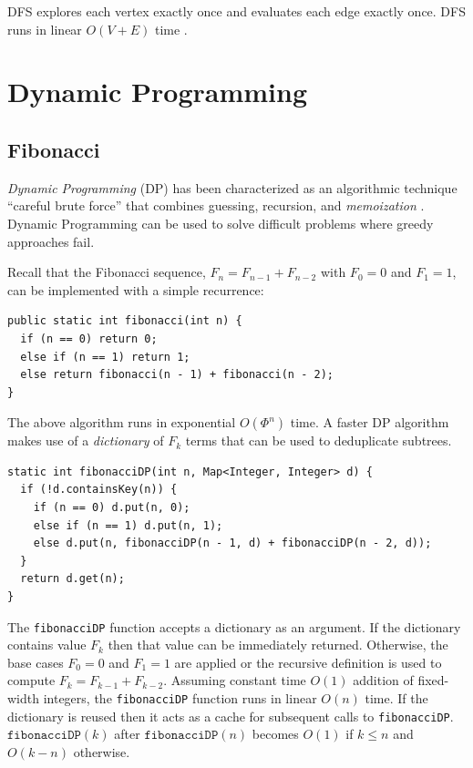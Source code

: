 \documentclass{book}
\begin{document}
DFS explores each vertex exactly once and evaluates each edge exactly once. DFS runs in linear $O(V+E)$ time \cite{cormen2001introduction}.

\chapter{Dynamic Programming}

\section{Fibonacci}

\textit{Dynamic Programming} (DP) has been characterized as an algorithmic technique ``careful brute force'' that combines guessing, recursion, and \textit{memoization} \cite{demaine_dp2}. Dynamic Programming can be used to solve difficult problems where greedy approaches fail.

Recall that the Fibonacci sequence, $F_n=F_{n-1} + F_{n-2}$ with $F_0=0$ and $F_1=1$, can be implemented with a simple recurrence:

\begin{lstlisting}
public static int fibonacci(int n) {
  if (n == 0) return 0;
  else if (n == 1) return 1;
  else return fibonacci(n - 1) + fibonacci(n - 2);
}
\end{lstlisting}

The above algorithm runs in exponential $O(\Phi^n)$ time. A faster DP algorithm makes use of a \textit{dictionary} of $F_k$ terms that can be used to deduplicate subtrees.

\begin{lstlisting}
static int fibonacciDP(int n, Map<Integer, Integer> d) {
  if (!d.containsKey(n)) {
    if (n == 0) d.put(n, 0);
    else if (n == 1) d.put(n, 1);
    else d.put(n, fibonacciDP(n - 1, d) + fibonacciDP(n - 2, d));
  }
  return d.get(n);
}
\end{lstlisting}

The \texttt{fibonacciDP} function accepts a dictionary as an argument. If the dictionary contains value $F_k$ then that value can be immediately returned. Otherwise, the base cases $F_0=0$ and $F_1=1$ are applied or the recursive definition is used to compute $F_k=F_{k-1}+F_{k-2}$. Assuming constant time $O(1)$ addition of fixed-width integers, the \texttt{fibonacciDP} function runs in linear $O(n)$ time. If the dictionary is reused then it acts as a cache for subsequent calls to \texttt{fibonacciDP}. $\texttt{fibonacciDP}(k)$ after $\texttt{fibonacciDP}(n)$ becomes $O(1)$ if $k \le n$ and $O(k - n)$ otherwise.
\end{document}
